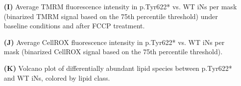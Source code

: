 \begin{itemize}
\item[\textbf{(I)}] Average TMRM fluorescence intensity in p.Tyr622* vs. WT iNs per mask (binarized TMRM signal based on the 75th percentile threshold) under baseline conditions and after FCCP treatment.\\
\item[\textbf{(J)}] Average CellROX fluorescence intensity in p.Tyr622* vs. WT iNs per mask (binarized CellROX signal based on the 75th percentile threshold).\\
\item[\textbf{(K)}] Volcano plot of differentially abundant lipid species between p.Tyr622* and WT iNs, colored by lipid class.
\end{itemize}